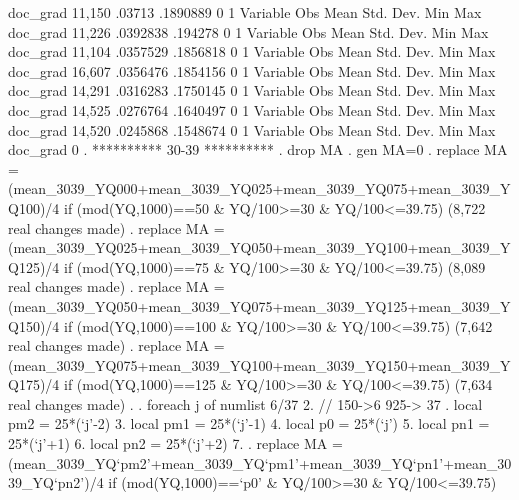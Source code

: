     doc_grad {\VBAR}     11,150      .03713    .1890889          0          1
{\smallskip}
    Variable {\VBAR}        Obs        Mean    Std. Dev.       Min        Max
    doc_grad {\VBAR}     11,226    .0392838     .194278          0          1
{\smallskip}
    Variable {\VBAR}        Obs        Mean    Std. Dev.       Min        Max
    doc_grad {\VBAR}     11,104    .0357529    .1856818          0          1
{\smallskip}
    Variable {\VBAR}        Obs        Mean    Std. Dev.       Min        Max
    doc_grad {\VBAR}     16,607    .0356476    .1854156          0          1
{\smallskip}
    Variable {\VBAR}        Obs        Mean    Std. Dev.       Min        Max
    doc_grad {\VBAR}     14,291    .0316283    .1750145          0          1
{\smallskip}
    Variable {\VBAR}        Obs        Mean    Std. Dev.       Min        Max
    doc_grad {\VBAR}     14,525    .0276764    .1640497          0          1
{\smallskip}
    Variable {\VBAR}        Obs        Mean    Std. Dev.       Min        Max
    doc_grad {\VBAR}     14,520    .0245868    .1548674          0          1
{\smallskip}
    Variable {\VBAR}        Obs        Mean    Std. Dev.       Min        Max
    doc_grad {\VBAR}          0
{\smallskip}
. **********  30-39 **********
. drop MA
{\smallskip}
. gen MA=0
{\smallskip}
. replace MA = (mean_3039_YQ000+mean_3039_YQ025+mean_3039_YQ075+mean_3039_YQ100)/4 if (mod(YQ,1000)==50 \& YQ/100>=30 \& YQ/100<=39.75)
(8,722 real changes made)
{\smallskip}
. replace MA = (mean_3039_YQ025+mean_3039_YQ050+mean_3039_YQ100+mean_3039_YQ125)/4 if (mod(YQ,1000)==75 \& YQ/100>=30 \& YQ/100<=39.75)
(8,089 real changes made)
{\smallskip}
. replace MA = (mean_3039_YQ050+mean_3039_YQ075+mean_3039_YQ125+mean_3039_YQ150)/4 if (mod(YQ,1000)==100 \& YQ/100>=30 \& YQ/100<=39.75)
(7,642 real changes made)
{\smallskip}
. replace MA = (mean_3039_YQ075+mean_3039_YQ100+mean_3039_YQ150+mean_3039_YQ175)/4 if (mod(YQ,1000)==125 \& YQ/100>=30 \& YQ/100<=39.75)
(7,634 real changes made)
{\smallskip}
. 
. foreach j of numlist 6/37{\lbr}
  2.         // 150->6 925-> 37
.         local pm2 = 25*(`j'-2)
  3.         local pm1 = 25*(`j'-1)
  4.         local p0 = 25*(`j')
  5.         local pn1 = 25*(`j'+1)
  6.         local pn2 = 25*(`j'+2)
  7. 
.         replace MA = (mean_3039_YQ`pm2'+mean_3039_YQ`pm1'+mean_3039_YQ`pn1'+mean_3039_YQ`pn2')/4 if (mod(YQ,1000)==`p0' \& YQ/100>=30 \& YQ/100<=39.75)
